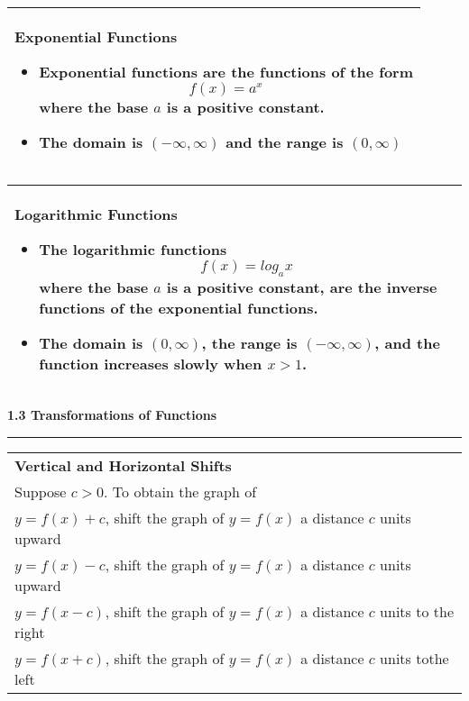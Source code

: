 \documentclass[fleqn]{article}
\begin{document}
\begin{center}
\def\arraystretch{1.3}
{\setlength{\tabcolsep}{16pt}
\begin{tabularx}{.9\textwidth}{|X|}
\hline
	\vspace{1pt}
	\textbf{Exponential Functions}
	\begin{itemize}
	\item \textbf{Exponential functions} are the functions of the form 
	$$f(x) = a^x$$
	where the base $a$ is a positive constant.
	\item The domain is $(-\infty, \infty)$ and the range is $(0,\infty)$
	\end{itemize} \\
\hline
\end{tabularx}}
\vspace{12pt}

\def\arraystretch{1.3}
{\setlength{\tabcolsep}{16pt}
\begin{tabularx}{.9\textwidth}{|X|}
\hline
	\vspace{1pt}
	\textbf{Logarithmic Functions}
	\begin{itemize}
	\item The \textbf{logarithmic functions}
	$$f(x) = log_a x$$
	where the base $a$ is a positive constant, are the inverse functions of the exponential functions. 
	\item The domain is $(0, \infty)$, the range is $(-\infty, \infty)$, and the function increases slowly when $x > 1$.
	\end{itemize} \\
\hline
\end{tabularx}}
\vspace{64pt}

\Large\textbf{1.3 Transformations of Functions}

\noindent\hfill\rule{0.3\textwidth}{.4pt}\hfill
\vspace{12pt}

\large

\def\arraystretch{1.3}
{\setlength{\tabcolsep}{16pt}
\begin{tabularx}{.9\textwidth}{|X|}
\hline
	\vspace{1pt}
	\textbf{Vertical and Horizontal Shifts} \\[6pt]
	\hspace{12pt} Suppose $c>0$. To obtain the graph of \\[6pt]
	\hspace{12pt} $y = f(x) + c$, shift the graph of $y = f(x)$ a distance $c$ units upward \\[3pt]
	\hspace{12pt} $y = f(x) - c$, shift the graph of $y = f(x)$ a distance $c$ units upward \\[3pt]
	\hspace{12pt} $y = f(x-c)$, shift the graph of $y = f(x)$ a distance $c$ units to the right \\[3pt]
	\hspace{12pt} $y = f(x+c)$, shift the graph of $y = f(x)$ a distance $c$ units tothe left \\[12pt]	
\hline
\end{tabularx}}
\vspace{12pt}


\end{center}
\end{document}
